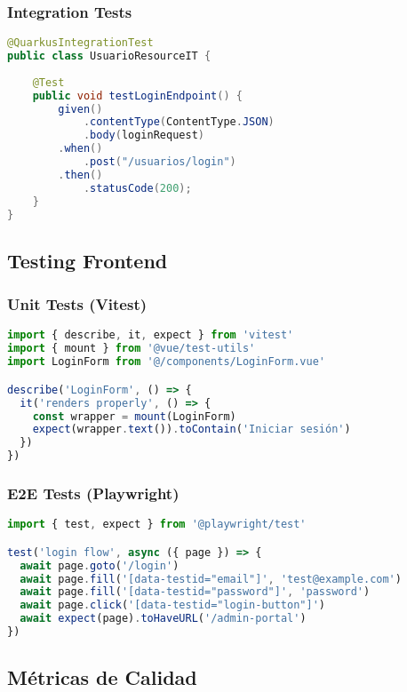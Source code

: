 \documentclass[12pt,a4paper]{article}
\begin{document}
\subsubsection{Integration Tests}
\begin{lstlisting}[language=java]
@QuarkusIntegrationTest
public class UsuarioResourceIT {
    
    @Test
    public void testLoginEndpoint() {
        given()
            .contentType(ContentType.JSON)
            .body(loginRequest)
        .when()
            .post("/usuarios/login")
        .then()
            .statusCode(200);
    }
}
\end{lstlisting}

\subsection{Testing Frontend}

\subsubsection{Unit Tests (Vitest)}
\begin{lstlisting}[language=typescript]
import { describe, it, expect } from 'vitest'
import { mount } from '@vue/test-utils'
import LoginForm from '@/components/LoginForm.vue'

describe('LoginForm', () => {
  it('renders properly', () => {
    const wrapper = mount(LoginForm)
    expect(wrapper.text()).toContain('Iniciar sesión')
  })
})
\end{lstlisting}

\subsubsection{E2E Tests (Playwright)}
\begin{lstlisting}[language=typescript]
import { test, expect } from '@playwright/test'

test('login flow', async ({ page }) => {
  await page.goto('/login')
  await page.fill('[data-testid="email"]', 'test@example.com')
  await page.fill('[data-testid="password"]', 'password')
  await page.click('[data-testid="login-button"]')
  await expect(page).toHaveURL('/admin-portal')
})
\end{lstlisting}

\subsection{Métricas de Calidad}
\end{document}
